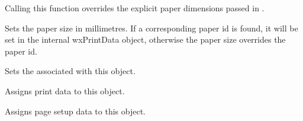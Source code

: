Calling this function overrides the explicit paper dimensions passed in .

\label{wxpagesetupdialogdatasetpapersize}


Sets the paper size in millimetres. If a corresponding paper id is found, it will be set in the
internal wxPrintData object, otherwise the paper size overrides the paper id.

\label{wxpagesetupdialogdatasetprintdata}


Sets the  associated with this object.

\label{wxpagesetupdialogdataassign}


Assigns print data to this object.


Assigns page setup data to this object.


